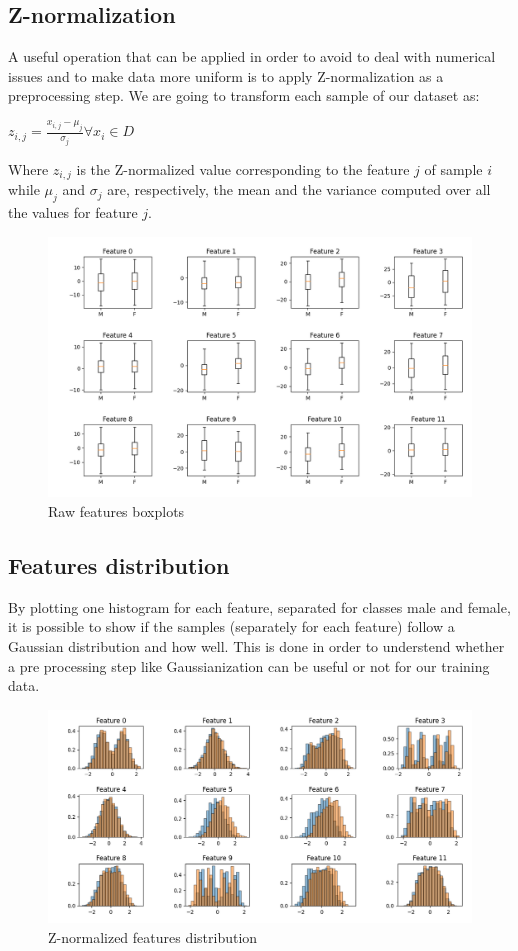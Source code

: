 \documentclass[10pt, a4paper, twocolumn]{article} %
\begin{document}
\subsection{Z-normalization}
A useful operation that can be applied in order to avoid to deal with numerical 
issues and to make data more uniform is to apply Z-normalization as a preprocessing step. We 
are going to transform each sample of our dataset as:
\begin{center}
	$z_{i,j} = \frac{x_{i,j} - \mu_{j}}{\sigma_{j}} \forall x_{i} \in D$
\end{center}
Where $z_{i,j}$ is the Z-normalized value corresponding to the feature $j$
of sample $i$ while $\mu_{j}$ and $\sigma_{j}$ are, respectively,
the mean and the variance computed over all the values for feature $j$.

\begin{figure}[ht!]
	\includegraphics[width=\linewidth]{./Pictures/FeaturesAnalysis/boxplot.png}
	\caption{Raw features boxplots}
	\label{boxplot} 
\end{figure}

\subsection{Features distribution}
By plotting one histogram for each feature, separated for classes male and female, it is possible to show
if the samples (separately for each feature) follow a Gaussian distribution and how well. This
is done in order to understend whether a pre processing step like Gaussianization can be useful or not for our training data.
\begin{figure}[ht!]
	\includegraphics[width=\linewidth]{./Pictures/FeaturesAnalysis/hist_znorm.png}
	\caption{Z-normalized features distribution}
	\label{hist_znorm} 
\end{figure}
\end{document}
